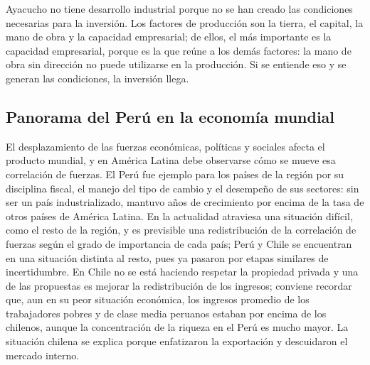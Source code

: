 \documentclass[
  man,
  floatsintext,
  longtable,
  a4paper,
  nolmodern,
  notxfonts,
  notimes,
  12pt,
  colorlinks=true,linkcolor=blue,citecolor=blue,urlcolor=blue]{apa7}
\begin{document}
Ayacucho no tiene desarrollo industrial porque no se han creado las
condiciones necesarias para la inversión. Los factores de producción son
la tierra, el capital, la mano de obra y la capacidad empresarial; de
ellos, el más importante es la capacidad empresarial, porque es la que
reúne a los demás factores: la mano de obra sin dirección no puede
utilizarse en la producción. Si se entiende eso y se generan las
condiciones, la inversión llega.

\subsection{Panorama del Perú en la economía
mundial}\label{panorama-del-peruxfa-en-la-economuxeda-mundial}

El desplazamiento de las fuerzas económicas, políticas y sociales afecta
el producto mundial, y en América Latina debe observarse cómo se mueve
esa correlación de fuerzas. El Perú fue ejemplo para los países de la
región por su disciplina fiscal, el manejo del tipo de cambio y el
desempeño de sus sectores: sin ser un país industrializado, mantuvo años
de crecimiento por encima de la tasa de otros países de América Latina.
En la actualidad atraviesa una situación difícil, como el resto de la
región, y es previsible una redistribución de la correlación de fuerzas
según el grado de importancia de cada país; Perú y Chile se encuentran
en una situación distinta al resto, pues ya pasaron por etapas similares
de incertidumbre. En Chile no se está haciendo respetar la propiedad
privada y una de las propuestas es mejorar la redistribución de los
ingresos; conviene recordar que, aun en su peor situación económica, los
ingresos promedio de los trabajadores pobres y de clase media peruanos
estaban por encima de los chilenos, aunque la concentración de la
riqueza en el Perú es mucho mayor. La situación chilena se explica
porque enfatizaron la exportación y descuidaron el mercado interno.
\end{document}
